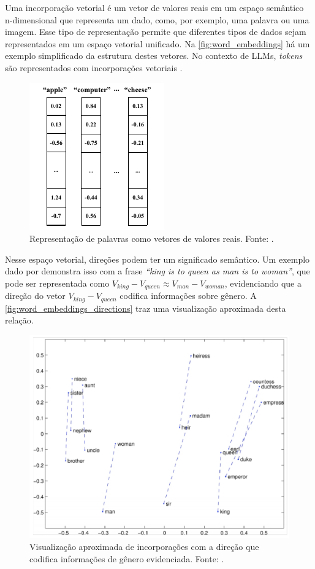 Uma incorporação vetorial é um vetor de valores reais em um espaço semântico n-dimensional que representa um dado, como, por exemplo, uma palavra ou uma imagem. Esse
tipo de representação permite que diferentes tipos de dados sejam representados em um espaço vetorial unificado. Na \autoref{fig:word_embeddings} há um exemplo
simplificado da estrutura destes vetores. No contexto de \acp{LLM}, \textit{tokens} são representados com incorporações vetoriais \cite{word_embedding, mllm_survey_2023}.

\begin{figure}[ht]
      \centering
      \includegraphics[width=0.3\columnwidth,keepaspectratio]{images/word_embeddings.pdf}
      \caption{Representação de palavras como vetores de valores reais. Fonte: \textcite{word_embedding}.}
      \label{fig:word_embeddings}
\end{figure}

Nesse espaço vetorial, direções podem ter um significado semântico. Um exemplo dado por \textcite{glove} demonstra isso com a frase \textit{``king is to queen as man is
      to woman''}, que pode ser representada como \begin{math}V_{king} - V_{queen} \approx V_{man} - V_{woman}\end{math}, evidenciando que a direção do vetor
\begin{math}V_{king} - V_{queen}\end{math} codifica informações sobre gênero. A \autoref{fig:word_embeddings_directions} traz uma visualização aproximada desta relação.

\begin{figure}[ht]
      \centering
      \includegraphics[width=0.6\columnwidth,keepaspectratio]{images/word_embeddings_directions.png}
      \caption{Visualização aproximada de incorporações com a direção que codifica informações de gênero evidenciada. Fonte: \textcite{word_embedding}.}
      \label{fig:word_embeddings_directions}
\end{figure}

